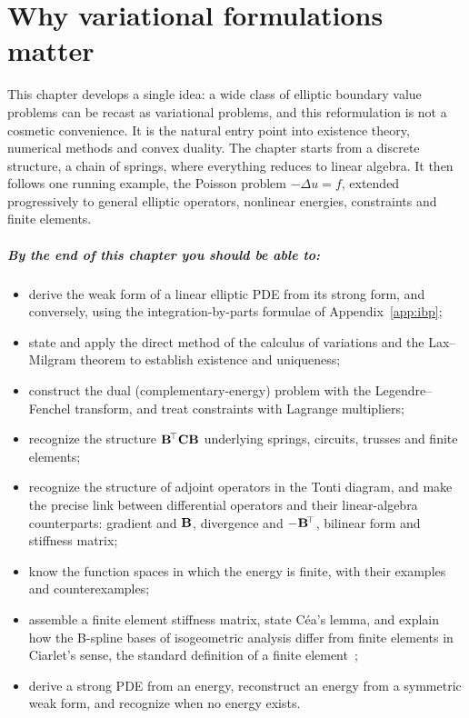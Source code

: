 \chapter{Why variational formulations matter}\label{ch:var}

This chapter develops a single idea: a wide class of elliptic boundary value
problems can be recast as variational problems, and this reformulation is not
a cosmetic convenience. It is the natural entry point into existence theory,
numerical methods and convex duality. The chapter starts from a discrete
structure, a chain of springs, where everything reduces to linear algebra.
It then follows one running example, the Poisson problem $-\Delta u=f$,
extended progressively to general elliptic operators, nonlinear energies,
constraints and finite elements.

\paragraph{By the end of this chapter you should be able to:}
\begin{itemize}
  \item derive the weak form of a linear elliptic PDE from its strong form,
  and conversely, using the integration-by-parts formulae of
  Appendix~\ref{app:ibp};
  \item state and apply the direct method of the calculus of variations and
  the Lax--Milgram theorem to establish existence and uniqueness;
  \item construct the dual (complementary-energy) problem with the
  Legendre--Fenchel transform, and treat constraints with Lagrange
  multipliers;
  \item recognize the structure $\mathbf{B}^{\!\top}\mathbf{C}\mathbf{B}$ underlying springs,
  circuits, trusses and finite elements;
  \item recognize the structure of adjoint operators in the Tonti diagram, and
  make the precise link between differential operators and their
  linear-algebra counterparts: gradient and $\mathbf{B}$, divergence and
  $-\mathbf{B}^{\!\top}$, bilinear form and stiffness matrix;
  \item know the function spaces in which the energy is finite, with their
  examples and counterexamples;
  \item assemble a finite element stiffness matrix, state C\'ea's lemma, and
  explain how the B-spline bases of isogeometric analysis differ from finite
  elements in Ciarlet's sense, the standard definition of a finite
  element~\cite{Ciarlet2002};
  \item derive a strong PDE from an energy, reconstruct an energy from a
  symmetric weak form, and recognize when no energy exists.
\end{itemize}


